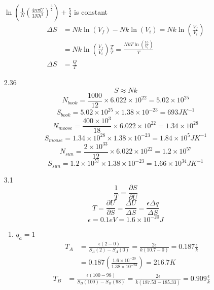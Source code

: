 \documentclass{article}
\begin{document}
\begin{enumerate}
\begin{align*}
        \end{align*}
        \(\ln\left( \frac{1}{N} \left( \frac{4n \pi U}{3Nh^3} \right)^{\frac{3}{2}} \right) + \frac{5}{2}\) is constant
        \begin{align*}
            \Delta S &= Nk\ln(V_f) - Nk\ln(V_i) = Nk\ln\left( \frac{V_f}{V_i} \right) \\
            &= Nk\ln\left( \frac{V_f}{V_i} \right) \frac{T}{T} = \frac{NkT\ln\left( \frac{V_f}{V_i} \right)}{T} \\
            \Delta S &= \frac{Q}{T}
        \end{align*}
    \vspace{0.1in}
    \item [2.36]
        \[S \approx Nk\]
        \[N_{book} = \frac{1000}{12} \times 6.022 \times 10^{22} = 5.02 \times 10^{25}\]
        \[S_{book} = 5.02 \times 10^{25} \times 1.38 \times 10^{-23} = 693 JK^{-1}\]
        \[N_{moose} = \frac{400 \times 10^3}{18} \times 6.022 \times 10^{22} = 1.34 \times 10^{28}\]
        \[S_{moose} = 1.34 \times 10^{28} \times 1.38 \times 10^{-23} = 1.84 \times 10^5 JK^{-1}\]
        \[N_{sun} = \frac{2 \times 10^{33}}{12} \times 6.022 \times 10^{22} = 1.2 \times 10^{57}\]
        \[S_{sun} = 1.2 \times 10^{57} \times 1.38 \times 10^{-23} = 1.66 \times 10^{34} JK^{-1}\]
    \vspace{0.1in}
    \item [3.1]
        \[\frac{1}{T} = \frac{\partial S}{\partial U} \]
        \[T = \frac{\partial U}{\partial S} = \frac{\Delta U}{\Delta S} = \frac{\epsilon \Delta q}{\Delta S}\]
        \[\epsilon = 0.1 eV = 1.6 \times 10^{-20} J\]
        \begin{enumerate}
            \item \(q_a = 1\)
            \begin{align*}
                T_A &= \frac{\epsilon (2 - 0)}{S_A(2) - S_A(0)} = \frac{2 \epsilon}{k(10.7 - 0)} = 0.187 \frac{\epsilon}{k} \\
                &= 0.187 \left( \frac{1.6 \times 10^{-20}}{1.38 \times 10^{-23}} \right) = 216.7 K
            \end{align*}
            \begin{align*}
                T_B &= \frac{\epsilon (100 - 98)}{S_B(100) - S_B(98)} = \frac{2 \epsilon}{k(187.53 - 185.33)} = 0.909 \frac{\epsilon}{k} \\

\end{align*}
\end{enumerate}
\end{enumerate}
\end{document}
